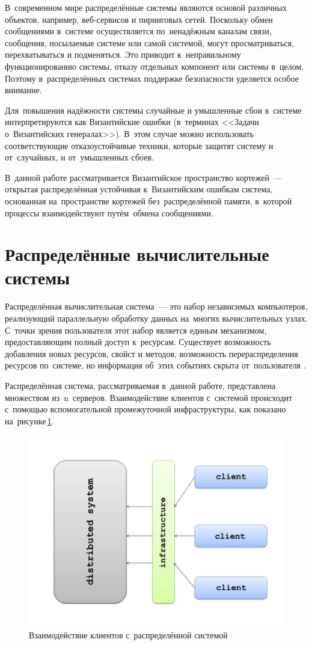 


\Intro
В~современном мире распределённые системы являются основой различных объектов, например, веб-сервисов и пиринговых сетей. Поскольку обмен сообщениями в~системе осуществляется по~ненадёжным каналам связи, сообщения, посылаемые системе или самой системой, могут просматриваться, перехватываться и подменяться. Это приводит к~неправильному функционированию системы, отказу отдельных компонент или системы в~целом. Поэтому в~распределённых системах поддержке безопасности уделяется особое внимание.

Для~повышения надёжности системы случайные и умышленные сбои в~системе интерпретируются как Византийские ошибки (в~терминах <<Задачи о~Византийских генералах>>). В~этом случае можно использовать соответствующие отказоустойчивые техники, которые защитят систему и от~случайных, и от~умышленных сбоев.

В~данной работе рассматривается Византийское пространство кортежей~--- открытая распределённая устойчивая к~Византийским ошибкам система, основанная на~пространстве кортежей без~распределённой памяти, в~которой процессы взаимодействуют путём~обмена сообщениями.


\pagebreak


\section{Распределённые вычислительные системы}\label{sec:1}
Распределённая вычислительная система~--- это набор независимых компьютеров, реализующий параллельную обработку данных на~многих вычислительных узлах. С~точки зрения пользователя этот набор является единым механизмом, предоставляющим полный доступ к~ресурсам. Существует возможность добавления новых ресурсов, свойст и методов, возможность перераспределения ресурсов по~системе, но информация об~этих событиях скрыта от~пользователя \autocite{Tanenbaum}.

Распределённая система, рассматриваемая в~данной работе, представлена множеством из~n~серверов. Взаимодействие клиентов с~системой происходит с~помощью вспомогательной промежуточной инфраструктуры, как показано на~рисунке\,\ref{clser}.
\begin{figure}[H]
	\centering \includegraphics[width=0.7 \textwidth, height=0.5 \textwidth]{img/ClientServer}  \caption{Взаимодействие клиентов с~распределённой системой} \label{clser}
\end{figure}

